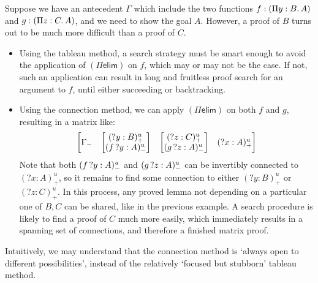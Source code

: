 \documentclass[twoside]{report}
\begin{document}
\begin{example}
    Suppose we have an antecedent $\Gamma$ which include the two functions $f : (\Pi{y} : {B}.\,{A})$ and $g : (\Pi{z} : {C}.\,{A})$, and we need to show the goal $A$. However, a proof of $B$ turns out to be much more difficult than a proof of $C$.

    \begin{itemize}
        \item Using the tableau method, a search strategy must be smart enough to avoid the application of $(\Pi\mathsf{elim})$ on $f$, which may or may not be the case. If not, such an application can result in long and fruitless proof search for an argument to $f$, until either succeeding or backtracking.

        \item Using the connection method, we can apply $(\Pi\mathsf{elim})$ on both $f$ and $g$, resulting in a matrix like:
              $$
                  \begin{bmatrix}\Gamma_- & \begin{bmatrix}({?y} : B)^u_+ \\ ({f}\,{?y} : A)^u_-\end{bmatrix} & \begin{bmatrix}({?z} : C)^u_+ \\ ({g}\,{?z} : A)^u_-\end{bmatrix} & ({?x} : A)^u_+\end{bmatrix}
              $$
              Note that both $({f}\,{?y} : A)^u_-$ and $({g}\,{?z} : A)^u_-$ can be invertibly connected to $({?x} : A)^u_+$, so it remains to find some connection to either $({?y} : B)^u_+$ or $({?z} : C)^u_+$. In this process, any proved lemma not depending on a particular one of $B, C$ can be shared, like in the previous example. A search procedure is likely to find a proof of $C$ much more easily, which immediately results in a spanning set of connections, and therefore a finished matrix proof.
    \end{itemize}

    Intuitively, we may understand that the connection method is `always open to different possibilities', instead of the relatively `focused but stubborn' tableau method.
\end{example}
\end{document}
